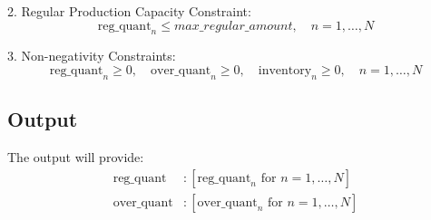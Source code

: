 \documentclass{article}
\begin{document}
2. Regular Production Capacity Constraint:
   \[
   \text{reg\_quant}_n \leq max\_regular\_amount, \quad n = 1, \ldots, N
   \]

3. Non-negativity Constraints:
   \[
   \text{reg\_quant}_n \geq 0, \quad \text{over\_quant}_n \geq 0, \quad \text{inventory}_n \geq 0, \quad n = 1, \ldots, N
   \]

\subsection*{Output}
The output will provide:
\begin{align*}
\text{reg\_quant} & : [\text{reg\_quant}_n \text{ for } n = 1,\ldots,N] \\
\text{over\_quant} & : [\text{over\_quant}_n \text{ for } n = 1,\ldots,N]
\end{align*}
\end{document}
